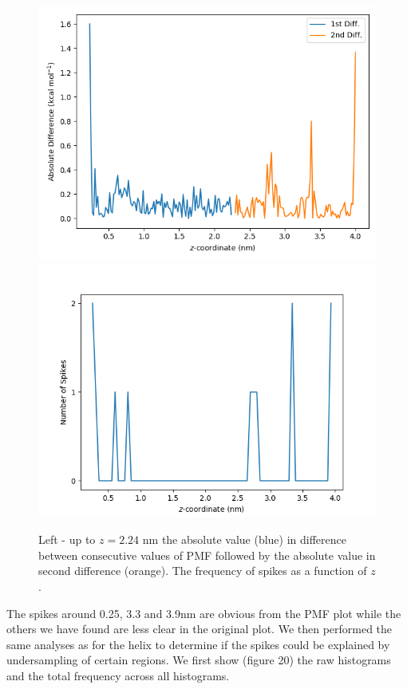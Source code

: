 \documentclass[12pt, onecolumn]{revtex4}    %
\begin{document}
\begin{figure}[h!]
\includegraphics[scale=0.4]{HairAbs}
\includegraphics[scale=0.44]{HairSpikes}
\label{fig: hairSpikes}
\caption{Left - up to $z = 2.24$ nm the absolute value (blue) in difference between consecutive values of PMF followed by the absolute value in second difference (orange).  The frequency of spikes as a function of $z$.}
\end{figure}

The spikes around 0.25, 3.3 and 3.9nm are obvious from the PMF plot while the others we have found are less clear in the original plot.  We then performed the same analyses as for the helix to determine if the spikes could be explained by undersampling of certain regions.  We first show (figure 20) the raw histograms and the total frequency across all histograms.\\
\end{document}
